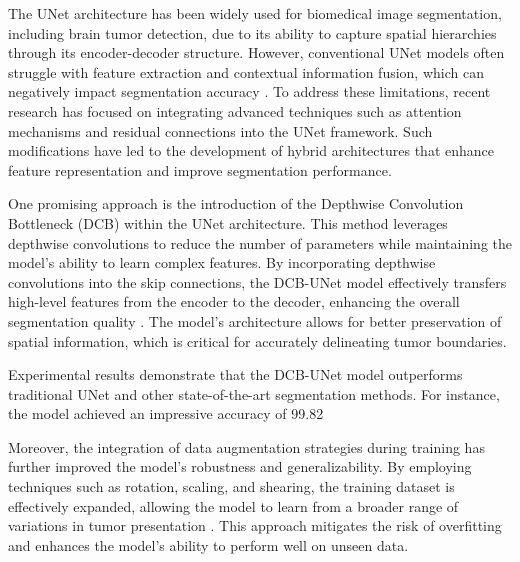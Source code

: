 \documentclass[runningheads]{llncs}
\begin{document}
The UNet architecture has been widely used for biomedical image segmentation, including brain tumor detection, due to its ability to capture spatial hierarchies through its encoder-decoder structure. However, conventional UNet models often struggle with feature extraction and contextual information fusion, which can negatively impact segmentation accuracy \cite{Ronneberger_2015, Lu_2022, Jena_2023}. To address these limitations, recent research has focused on integrating advanced techniques such as attention mechanisms and residual connections into the UNet framework. Such modifications have led to the development of hybrid architectures that enhance feature representation and improve segmentation performance.

One promising approach is the introduction of the Depthwise Convolution Bottleneck (DCB) within the UNet architecture. This method leverages depthwise convolutions to reduce the number of parameters while maintaining the model's ability to learn complex features. By incorporating depthwise convolutions into the skip connections, the DCB-UNet model effectively transfers high-level features from the encoder to the decoder, enhancing the overall segmentation quality \cite{Koh_2020, Daimary_2020, Havaei_2017}. The model's architecture allows for better preservation of spatial information, which is critical for accurately delineating tumor boundaries.

Experimental results demonstrate that the DCB-UNet model outperforms traditional UNet and other state-of-the-art segmentation methods. For instance, the model achieved an impressive accuracy of 99.82%

Moreover, the integration of data augmentation strategies during training has further improved the model's robustness and generalizability. By employing techniques such as rotation, scaling, and shearing, the training dataset is effectively expanded, allowing the model to learn from a broader range of variations in tumor presentation \cite{Garcea_2023, Buda_2019, Prados_2017}. This approach mitigates the risk of overfitting and enhances the model's ability to perform well on unseen data.
\end{document}
